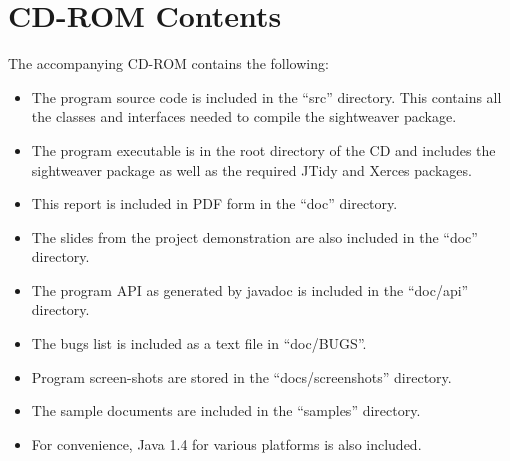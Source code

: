 \chapter{CD-ROM Contents}

The accompanying CD-ROM contains the following:

\begin{itemize}

\item The program source code is included in the ``src'' directory. This
contains all the classes and interfaces needed to compile the sightweaver
package.

\item The program executable is in the root directory of the CD and includes
the sightweaver package as well as the required JTidy and Xerces packages.

\item This report is included in PDF form in the ``doc'' directory.

\item The slides from the project demonstration are also included in the
``doc'' directory.

\item The program API as generated by javadoc is included in the ``doc/api''
directory. %

\item The bugs list is included as a text file in ``doc/BUGS''.

\item Program screen-shots are stored in the ``docs/screenshots'' directory.

\item The sample documents are included in the ``samples'' directory.

\item For convenience, Java 1.4 for various platforms is also included.

\end{itemize}

